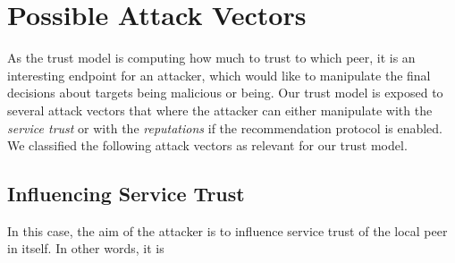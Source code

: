 \section{Possible Attack Vectors}
\label{sec:attack-vectors}
As the trust model is computing how much to trust to which peer, it is an interesting endpoint for an attacker, which would like to manipulate the final decisions about targets being malicious or being.
Our trust model is exposed to several attack vectors that where the attacker can either manipulate with the \textit{service trust} or with the \textit{reputations} if the recommendation protocol is enabled. We classified the following attack vectors as relevant for our trust model.

\subsection{Influencing Service Trust}
\label{subsec:influencing-service-trust}
In this case, the aim of the attacker is to influence service trust of the local peer in itself. In other words, it is
